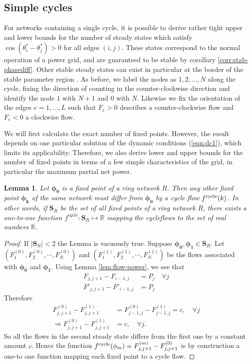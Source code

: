 \documentclass[10pt,aps,pre,preprint,superscriptaddress]{revtex4-1}
\renewcommand{\vec}[1]{\boldsymbol{#1}}
\newtheorem{lemma}{Lemma}
\begin{document}
\subsection{Simple cycles}
\label{sec:cycles}

For networks containing a single cycle, it is possible to derive rather
tight upper and lower bounds for the number of steady states which satisfy
$\cos(\theta_i^*  - \theta_j^*) > 0$ for all edges $(i,j)$. These states 
correspond to the normal operation of a power grid, and are guaranteed 
to be stable by corollary \ref{corr:stab-phasediff}. Other stable steady 
states can exist in particular at the border of the stable parameter 
region \cite{14bifurcation}. 
As before, we label the nodes as $1,2,\ldots,N$ along the cycle, fixing the
direction of counting in the counter-clockwise direction and identify the 
node $1$ with $N+1$ and $0$ with $N$. Likewise we fix the orientation 
of the edges $e = 1,\ldots,L$ such that $F_e>0$ describes a 
counter-clockwise flow and $F_e<0$ a clockwise flow.

We will first calculate the exact number of fixed points. However,
the result depends on one particular solution of the dynamic conditions
(\ref{eqn:dc1}), which limits its applicability. 
Therefore, we also derive lower and upper bounds for the number of 
fixed points in terms of a few simple characteristics of the grid, in 
particular the maximum partial net power. 


\begin{lemma}
\label{lem:cf-fp-corr}
Let $\vec{\phi_0}$ is a fixed point of a ring network $R$.  Then any other 
fixed point $\vec{\phi_k}$ of the same network must differ from $\vec{\phi_0}$ 
by a \emph{cycle flow} $f^{\rm cycle}(k)$.  
In other words, if $\mathbf{S}_R$ be the set 
of all fixed points of a ring network $R$, there exists a one-to-one 
function $f^{cycle}:\mathbf{S}_R\mapsto \mathbb{R}$ mapping the cycleflows to 
the set of real numbers $\mathbb{R}$.  
\end{lemma}


\begin{proof}
If $|\mathbf{S}_R|<2$  the Lemma is vacuously true.  
Suppose $\vec{\phi_0},\vec{\phi_1} \in \mathbf{S}_R$.   
Let $(F^{(0)}_1, F^{(0)}_2,\cdots,F^{(0)}_N)$ and $(F^{(1)}_1, F^{(1)}_2,\cdots,F^{(1)}_N)$ be the flows 
associated with $\vec{\phi_0}$ and $\vec{\phi_1}$.  
Using Lemma \ref{lem:flow-power}, we see that
\begin{align}
\label{}
F_{j,j+1}-F_{i-1,j}&=P_j\quad\forall j \\
F'_{j,j+1}-F'_{i-1,j}&=P_j
\end{align}
Therefore
\begin{align}
\label{}
F^{(0)}_{j,j+1}-F^{(1)}_{j,j+1}&=F^{(0)}_{j-1,j}-F^{(1)}_{j-1,j}=c,\quad\forall j\\
\Rightarrow F^{(0)}_{j,j+1}-F^{(1)}_{j,j+1}&=c,\quad\forall j.   
\end{align}
So all the flows in the second steady state differs from the first one by a 
constant amount $c$.   
Hence the function $f^{\rm cycle}(\phi_m)=F^{(m)}_{j,j+1}-F^{(0)}_{j,j+1}$ is by construction a 
one-to one function mapping each fixed point to a cycle flow.  
\end{proof}
\end{document}
